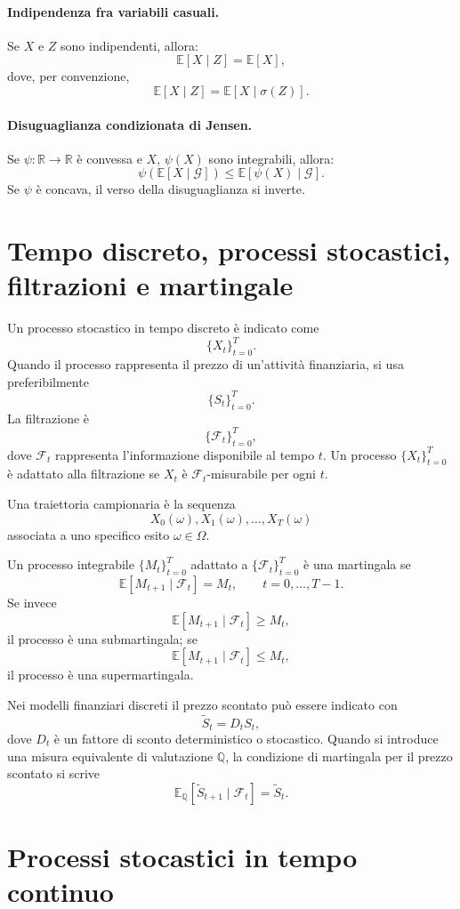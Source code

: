 \documentclass[12pt,a4paper]{article}
\newcommand{\R}{\mathbb{R}}
\newcommand{\E}{\mathbb{E}}
\newcommand{\Q}{\mathbb{Q}}
\newcommand{\F}{\mathcal{F}}
\newcommand{\G}{\mathcal{G}}
\newcommand{\1}{\mathbf{1}}
\begin{document}
\paragraph{Indipendenza fra variabili casuali.}
Se $X$ e $Z$ sono indipendenti, allora:
\[
\E[X\mid Z]=\E[X],
\]
dove, per convenzione,
\[
\E[X\mid Z]=\E[X\mid\sigma(Z)].
\]

\paragraph{Disuguaglianza condizionata di Jensen.}
Se $\psi:\R\to\R$ \`e convessa e $X$, $\psi(X)$ sono integrabili,
allora:
\[
\psi\left(\E[X\mid\G]\right)
\leq
\E[\psi(X)\mid\G].
\]
Se $\psi$ \`e concava, il verso della disuguaglianza si inverte.

\section{Tempo discreto, processi stocastici, filtrazioni e martingale}

Un processo stocastico in tempo discreto \`e indicato come
\[
 \{X_t\}_{t=0}^{T}.
\]
Quando il processo rappresenta il prezzo di un'attivit\`a finanziaria, si usa
preferibilmente
\[
 \{S_t\}_{t=0}^{T}.
\]
La filtrazione \`e
\[
 \{\F_t\}_{t=0}^{T},
\]
dove $\F_t$ rappresenta l'informazione disponibile al tempo $t$.
Un processo $\{X_t\}_{t=0}^{T}$ \`e adattato alla filtrazione se $X_t$ \`e
$\F_t$-misurabile per ogni $t$.

Una traiettoria campionaria \`e la sequenza
\[
 X_0(\omega),X_1(\omega),\ldots,X_T(\omega)
\]
associata a uno specifico esito $\omega\in\Omega$.

Un processo integrabile $\{M_t\}_{t=0}^{T}$ adattato a $\{\F_t\}_{t=0}^{T}$ \`e
una martingala se
\[
 \E[M_{t+1}\mid\F_t]=M_t,
 \qquad t=0,\ldots,T-1.
\]
Se invece
\[
 \E[M_{t+1}\mid\F_t]\geq M_t,
\]
il processo \`e una submartingala; se
\[
 \E[M_{t+1}\mid\F_t]\leq M_t,
\]
il processo \`e una supermartingala.

Nei modelli finanziari discreti il prezzo scontato pu\`o essere indicato con
\[
 \widetilde S_t=D_tS_t,
\]
dove $D_t$ \`e un fattore di sconto deterministico o stocastico. Quando si
introduce una misura equivalente di valutazione $\Q$, la condizione di
martingala per il prezzo scontato si scrive
\[
 \E_{\Q}[\widetilde S_{t+1}\mid\F_t]=\widetilde S_t.
\]

\section{Processi stocastici in tempo continuo}
\end{document}
